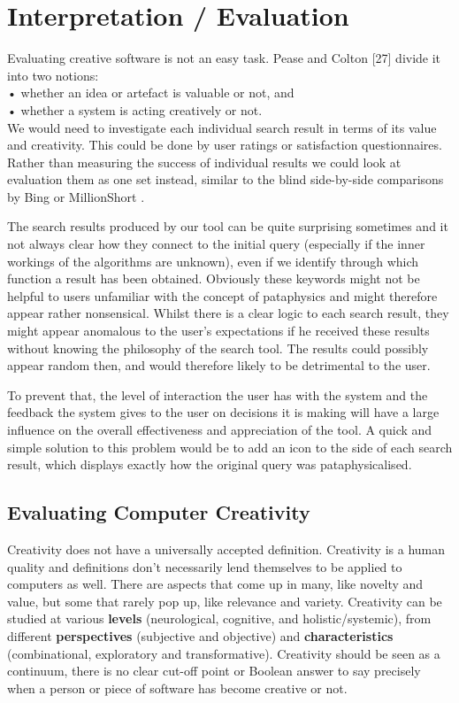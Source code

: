 
\chapter{Interpretation / Evaluation}
\label{ch:interpretation}

Evaluating creative software is not an easy task. Pease and Colton [27] divide it into two notions: \\
•	whether an idea or artefact is valuable or not, and\\
•	whether a system is acting creatively or not.\\
We would need to investigate each individual search result in terms of its value and creativity. This could be done by user ratings or satisfaction questionnaires. Rather than measuring the success of individual results we could look at evaluation them as one set instead, similar to the blind side-by-side comparisons by Bing or MillionShort .

The search results produced by our tool can be quite surprising sometimes and it not always clear how they connect to the initial query (especially if the inner workings of the algorithms are unknown), even if we identify through which function a result has been obtained. Obviously these keywords might not be helpful to users unfamiliar with the concept of pataphysics and might therefore appear rather nonsensical. Whilst there is a clear logic to each search result, they might appear anomalous to the user’s expectations if he received these results without knowing the philosophy of the search tool. The results could possibly appear random then, and would therefore likely to be detrimental to the user.

To prevent that, the level of interaction the user has with the system and the feedback the system gives to the user on decisions it is making will have a large influence on the overall effectiveness and appreciation of the tool. A quick and simple solution to this problem would be to add an icon to the side of each search result, which displays exactly how the original query was pataphysicalised.

\section{Evaluating Computer Creativity}

Creativity does not have a universally accepted definition. Creativity is a human quality and definitions don’t necessarily lend themselves to be applied to computers as well. There are aspects that come up in many, like novelty and value, but some that rarely pop up, like relevance and variety. Creativity can be studied at various \textbf{levels} (neurological, cognitive, and holistic/systemic), from different \textbf{perspectives} (subjective and objective) and \textbf{characteristics} (combinational, exploratory and transformative). Creativity should be seen as a continuum, there is no clear cut-off point or Boolean answer to say precisely when a person or piece of software has become creative or not.

